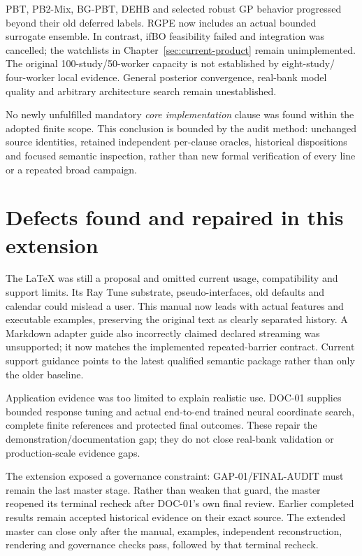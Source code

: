 PBT, PB2-Mix, BG-PBT, DEHB and selected robust GP behavior progressed beyond
their old deferred labels. RGPE now includes an actual bounded surrogate
ensemble. In contrast, ifBO feasibility failed and integration was cancelled;
the watchlists in Chapter~\ref{sec:current-product} remain unimplemented.
The original 100-study/50-worker capacity is not established by eight-study/
four-worker local evidence. General posterior convergence, real-bank model
quality and arbitrary architecture search remain unestablished.

No newly unfulfilled mandatory \emph{core implementation} clause was found
within the adopted finite scope. This conclusion is bounded by the audit
method: unchanged source identities, retained independent per-clause oracles,
historical dispositions and focused semantic inspection, rather than new
formal verification of every line or a repeated broad campaign.

\section{Defects found and repaired in this extension}

The LaTeX was still a proposal and omitted current usage, compatibility and
support limits. Its Ray Tune substrate, pseudo-interfaces, old defaults and
calendar could mislead a user. This manual now leads with actual features and
executable examples, preserving the original text as clearly separated history.
A Markdown adapter guide also incorrectly claimed declared streaming was
unsupported; it now matches the implemented repeated-barrier contract. Current
support guidance points to the latest qualified semantic package rather than
only the older baseline.

Application evidence was too limited to explain realistic use. DOC-01 supplies
bounded response tuning and actual end-to-end trained neural coordinate search,
complete finite references and protected final outcomes. These repair the
demonstration/documentation gap; they do not close real-bank validation or
production-scale evidence gaps.

The extension exposed a governance constraint: GAP-01/FINAL-AUDIT must remain
the last master stage. Rather than weaken that guard, the master reopened its
terminal recheck after DOC-01's own final review. Earlier completed results
remain accepted historical evidence on their exact source. The extended master
can close only after the manual, examples, independent reconstruction,
rendering and governance checks pass, followed by that terminal recheck.

